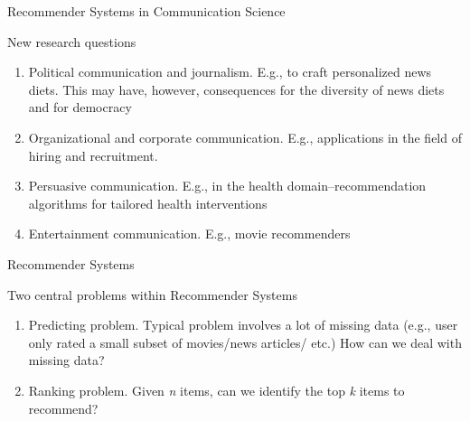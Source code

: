 \documentclass[handout]{beamer}
\begin{document}
\begin{frame}
\end{frame}


\begin{frame}{Recommender Systems in Communication Science}  
	\begin{block}{New research questions}
		\begin{enumerate}
			\item<2-> \alert{Political communication and journalism}. E.g., to craft personalized news diets. This may have, however, consequences for the diversity of news diets and for democracy \parencite{Moller2018, Locherbach2018}
			\item<3-> \alert{Organizational and corporate communication}. E.g., applications in the field of hiring and recruitment.
			\item<4-> \alert{Persuasive communication}. E.g., in the health domain--recommendation algorithms for tailored health interventions \parencite{Kim2019}
			\item<5-> \alert{Entertainment communication}. E.g., movie recommenders
				\end{enumerate}
	\end{block}
\end{frame}

\begin{frame}{Recommender Systems} 
\begin{block}{Two central problems within Recommender Systems}
	\begin{enumerate}
		\item<2-> \alert{Predicting problem}. Typical problem involves a lot of missing data (e.g., user only rated a small subset of movies/news articles/ etc.) How can we deal with missing data? 
		\item<3-> \alert{Ranking problem}.  Given \textit{n} items, can we identify the top \textit{k} items to recommend?
	\end{enumerate}
\end{block}
\end{frame}
\end{document}
